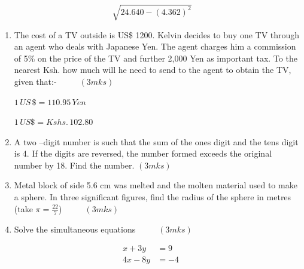\documentclass[
  a4paperpaper,
]{scrbook}
\begin{document}
\begin{tcolorbox}
\[\sqrt[]{24.640-(4.362)^2} \]

\begin{enumerate}
\def\labelenumi{\arabic{enumi}.}
\setcounter{enumi}{5}
\item
  The cost of a TV outside is US\$ 1200. Kelvin decides to buy one TV
  through an agent who deals with Japanese Yen. The agent charges him a
  commission of 5\% on the price of the TV and further 2,000 Yen as
  important tax. To the nearest Ksh. how much will he need to send to
  the agent to obtain the TV, given that:- \(\hspace{1cm} (3mks)\)

  \(1\,US\, \$ = 110.95 \,Yen\)

  \(1\,US \$ = Kshs. \,102.80\)
\item
  A two --digit number is such that the sum of the ones digit and the
  tens digit is 4. If the digits are reversed, the number formed exceeds
  the original number by 18. Find the number. \((3mks)\)
\item
  Metal block of side 5.6 cm was melted and the molten material used to
  make a sphere. In three significant figures, find the radius of the
  sphere in metres (take \(\pi =\frac{22}{7}\)) \(\hspace{1cm} (3mks)\)
\item
  Solve the simultaneous equations \(\hspace{1cm} (3mks)\)
\end{enumerate}

\[
    \begin{align*}
     x+3y&=9\\
     4x-8y&=-4
    \end{align*}
\]


\end{tcolorbox}
\end{document}
